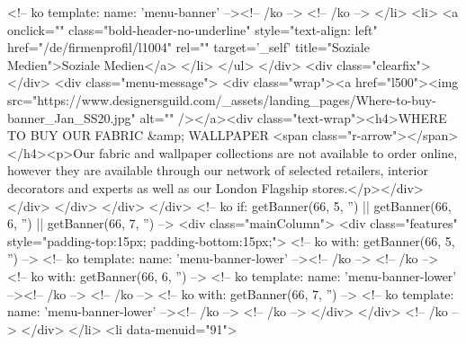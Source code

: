 <!-- ko template: { name: 'menu-banner' } --><!-- /ko -->
<!-- /ko -->
</li>
<li>
<a onclick="" class="bold-header-no-underline" style="text-align: left" href="/de/firmenprofil/l1004" rel="" target='_self' title="Soziale Medien">Soziale Medien</a>
</li>
</ul>
</div>
<div class="clearfix"></div>
<div class="menu-message">
<div class="wrap"><a href="l500"><img src="https://www.designersguild.com/_assets/landing_pages/Where-to-buy-banner_Jan_SS20.jpg" alt="" /></a><div class="text-wrap"><h4>WHERE TO BUY OUR FABRIC &amp; WALLPAPER <span class="r-arrow"></span></h4><p>Our fabric and wallpaper collections are not available to order online, however they are available through our network of selected retailers, interior decorators and experts as well as our London Flagship stores.</p></div></div>
</div>
</div>
</div>
<!-- ko if: getBanner(66, 5, '') || getBanner(66, 6, '') || getBanner(66, 7, '') -->
<div class="mainColumn">
<div class="features" style="padding-top:15px; padding-bottom:15px;">
<!-- ko with: getBanner(66, 5, '') -->
<!-- ko template: { name: 'menu-banner-lower' } --><!-- /ko -->
<!-- /ko -->
<!-- ko with: getBanner(66, 6, '') -->
<!-- ko template: { name: 'menu-banner-lower' } --><!-- /ko -->
<!-- /ko -->
<!-- ko with: getBanner(66, 7, '') -->
<!-- ko template: { name: 'menu-banner-lower' } --><!-- /ko -->
<!-- /ko -->
</div>
</div>
<!-- /ko -->
</div>
</li>
<li data-menuid="91">

